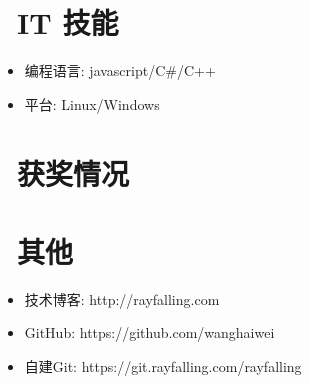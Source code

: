 \documentclass{resume}
\begin{document}
\section{\faCogs\ IT 技能}
\begin{itemize}[parsep=0.5ex]
  \item 编程语言: javascript/C\#/C++
  \item 平台: Linux/Windows
\end{itemize}

\section{\faHeartO\ 获奖情况}

\section{\faInfo\ 其他}
\begin{itemize}[parsep=0.5ex]
  \item 技术博客: http://rayfalling.com
  \item GitHub: https://github.com/wanghaiwei
  \item 自建Git: https://git.rayfalling.com/rayfalling
\end{itemize}

%
%
\end{document}
